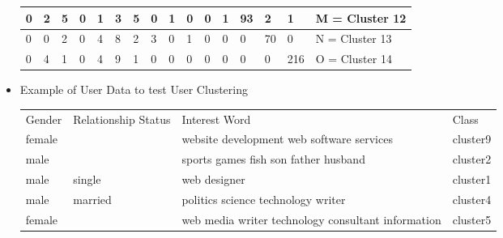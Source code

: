 \begin{itemize}
\begin{table}[H]
\begin{tabular}{|l|l|l|l|l|l|l|l|l|l|l|l|l|l|l|l|}
    0   & 2   & 5    & 0 & 1   & 3   & 5  & 0 & 1  & 0   & 0  & 1  & 93 & 2  & 1   & M = Cluster 12   \\ \hline
    0   & 0   & 2    & 0 & 4   & 8   & 2  & 3 & 0  & 1   & 0  & 0  & 0  & 70 & 0   & N = Cluster 13   \\ \hline
    0   & 4   & 1    & 0 & 4   & 9   & 1  & 0 & 0  & 0   & 0  & 0  & 0  & 0  & 216 & O = Cluster 14   \\ \hline
    \end{tabular}
\end{table}
\item Example of User Data to test User Clustering
\begin{table}
    \begin{tabular}{|l|l|l|l|}
    Gender & Relationship Status & Interest Word                                      & Class    \\
    female & ~                   & website development web  software services         & cluster9 \\
    male   & ~                   & sports games fish son father husband               & cluster2 \\
    male   & single              & web designer                                       & cluster1 \\
    male   & married             & politics science technology writer                 & cluster4 \\
    female & ~                   & web media writer technology consultant information & cluster5 \\
    \end{tabular}
\end{table}
\end{itemize}